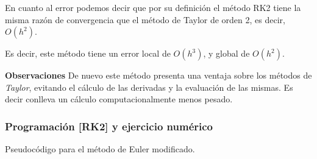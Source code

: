 \documentclass[paper=a4, fontsize=11pt]{scrartcl} %
\numberwithin{equation}{section}
\begin{document}
	
	En cuanto al error podemos decir que por su definición el método RK2 tiene la misma razón de convergencia que el método de Taylor de orden 2, es decir, $O(h^2)$.
	
	Es decir, este método tiene un error local de $O(h^3)$, y global de $O(h^2)$.
	
	\textbf{Observaciones}
	De nuevo este método presenta una ventaja sobre los métodos de \textit{Taylor}, evitando el cálculo de las derivadas y la evaluación de las mismas. Es decir conlleva un cálculo computacionalmente menos pesado.\newline
	
	\subsubsection{Programación [RK2] y ejercicio numérico}
	Pseudocódigo para el método de Euler modificado.
	\begin{center}
	\end{center}
	
\end{document}
